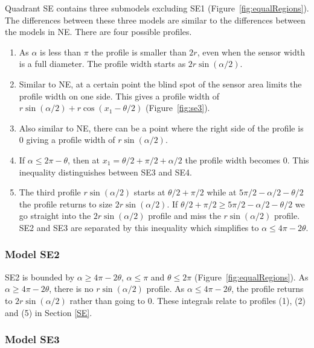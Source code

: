 Quadrant SE contains three submodels excluding SE1  (Figure~\ref{fig:equalRegions}).
The differences between these three models are similar to the differences between the models in NE.
There are four possible profiles.
\begin{enumerate}
\item As $\alpha$ is less than $\pi$ the profile is smaller than $2r$, even when the sensor width is a full diameter.
The profile width starts as $2r\sin(\alpha/2)$.
\item Similar to NE, at a certain point the blind spot of the sensor area limits the profile width on one side.
This gives a profile width of $r\sin(\alpha/2) + r\cos(x_1 - \theta/2)$ (Figure~\ref{fig:se3}).
\item Also similar to NE, there can be a point where the right side of the profile is 0 giving a profile width of $r\sin(\alpha/2)$.
\item If $\alpha \le 2\pi - \theta$, then at $x_1 = \theta/2 + \pi/2 + \alpha/2 $ the profile width becomes 0.
This inequality distinguishes between SE3 and SE4.
\item The third profile $r\sin(\alpha/2)$ starts at $\theta/2 + \pi/2$ while at $5\pi/2 - \alpha/2 - \theta/2$ the profile returns to size $2r\sin(\alpha/2)$.
If $\theta/2 + \pi/2 \ge 5\pi/2 - \alpha/2 - \theta/2$ we go straight into the  $2r\sin(\alpha/2)$ profile and miss the $r\sin(\alpha/2)$ profile.
 SE2 and SE3 are separated by this inequality which simplifies to $\alpha \le 4\pi - 2\theta$.

\end{enumerate}





\subsubsection{Model SE2} \label{SE2}

SE2 is bounded by $\alpha \ge 4\pi - 2\theta$, $\alpha \le \pi$ and $\theta \le 2\pi$ (Figure~\ref{fig:equalRegions}).
As $\alpha \ge 4\pi - 2\theta$, there is no $r\sin(\alpha/2)$ profile.
As $\alpha \le 4\pi - 2\theta$, the profile returns to $2r\sin(\alpha/2)$ rather than going to 0.
These integrals relate to profiles (1), (2) and (5) in Section \ref{SE}.




\subsubsection{Model SE3} \label{SE3}

